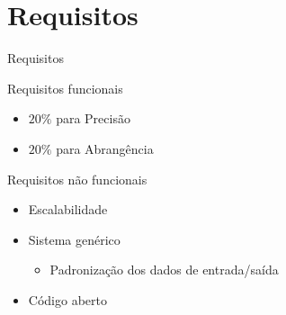 \section[Requisitos]{Requisitos}
\begin{frame}{Requisitos}
\begin{block}{Requisitos funcionais}
\begin{itemize}
	\item $20\%$ para Precisão
	\item $20\%$ para Abrangência
\end{itemize}
\end{block}

\begin{block}{Requisitos não funcionais}
\begin{itemize}
	\item Escalabilidade
	\item Sistema genérico
	\begin{itemize}
		\item Padronização dos dados de entrada/saída
	\end{itemize}
	\item Código aberto
\end{itemize}
\end{block}
\end{frame}

